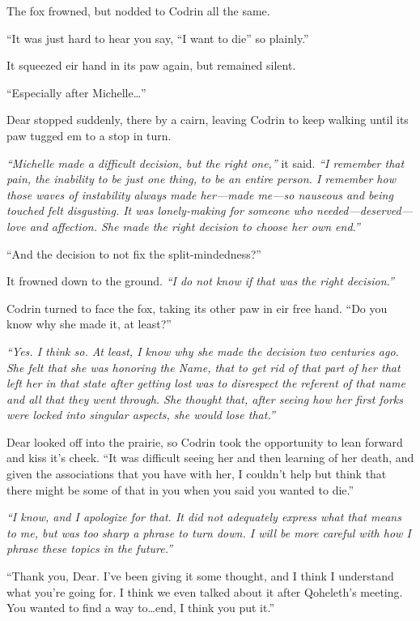 The fox frowned, but nodded to Codrin all the same.

``It was just hard to hear you say, ``I want to die'' so plainly.''

It squeezed eir hand in its paw again, but remained silent.

``Especially after Michelle\ldots{}''

Dear stopped suddenly, there by a cairn, leaving Codrin to keep walking until its paw tugged em to a stop in turn.

\emph{``Michelle made a difficult decision, but the right one,''} it said. \emph{``I remember that pain, the inability to be just one thing, to be an entire person. I remember how those waves of instability always made her---made me---so nauseous and being touched felt disgusting. It was lonely-making for someone who needed---deserved---love and affection. She made the right decision to choose her own end.''}

``And the decision to not fix the split-mindedness?''

It frowned down to the ground. \emph{``I do not know if that was the right decision.''}

Codrin turned to face the fox, taking its other paw in eir free hand. ``Do you know why she made it, at least?''

\emph{``Yes. I think so. At least, I know why she made the decision two centuries ago. She felt that she was honoring the Name, that to get rid of that part of her that left her in that state after getting lost was to disrespect the referent of that name and all that they went through. She thought that, after seeing how her first forks were locked into singular aspects, she would lose that.''}

Dear looked off into the prairie, so Codrin took the opportunity to lean forward and kiss it's cheek. ``It was difficult seeing her and then learning of her death, and given the associations that you have with her, I couldn't help but think that there might be some of that in you when you said you wanted to die.''

\emph{``I know, and I apologize for that. It did not adequately express what that means to me, but was too sharp a phrase to turn down. I will be more careful with how I phrase these topics in the future.''}

``Thank you, Dear. I've been giving it some thought, and I think I understand what you're going for. I think we even talked about it after Qoheleth's meeting. You wanted to find a way to\ldots end, I think you put it.''

